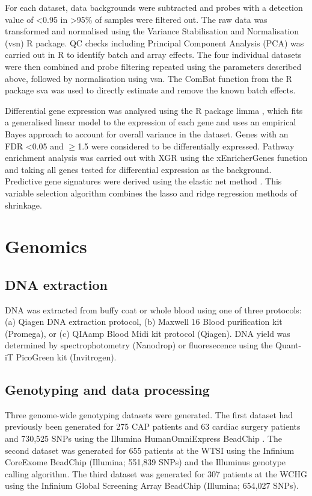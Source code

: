 For each dataset, data backgrounds were subtracted and probes with a detection value of \textless 0.95  in \textgreater 95\% of samples were filtered out. The raw data was transformed and normalised using the Variance Stabilisation and Normalisation (vsn) R package. QC checks including Principal Component Analysis (PCA) was carried out in R to identify batch and array effects. The four individual datasets were then combined and probe filtering repeated using the parameters described above, followed by normalisation using vsn. The ComBat function from the R package sva was used to directly estimate and remove the known batch effects. 

Differential gene expression was analysed using the R package limma \parencite{Ritchie2015}, which fits a generalised linear model to the expression of each gene and uses an empirical Bayes approach to account for overall variance in the dataset. Genes with an FDR \textless 0.05 and $\geq$1.5 were considered to be differentially expressed. Pathway enrichment analysis was carried out with XGR \parencite{Fang2016} using the xEnricherGenes function and taking all genes tested for differential expression as the background. Predictive gene signatures were derived using the elastic net method \parencite{Zou2005} \parencite{Herberg2016}. This variable selection algorithm combines the lasso and ridge regression methods of shrinkage. 

\section{Genomics}
\subsection{DNA extraction}
DNA was extracted from buffy coat or whole blood using one of three protocols: (a) Qiagen DNA extraction protocol, (b) Maxwell 16 Blood purification kit (Promega), or (c) QIAamp Blood Midi kit protocol (Qiagen). DNA yield was determined by spectrophotometry (Nanodrop) or fluoresecence using the Quant-iT PicoGreen kit (Invitrogen). 

\subsection{Genotyping and data processing}
Three genome-wide genotyping datasets were generated. The first dataset had previously been generated for 275 CAP patients and 63 cardiac surgery patients and 730,525 SNPs using the Illumina HumanOmniExpress BeadChip \parencite{Davenport2014}. The second dataset was generated for 655 patients at the WTSI using the Infinium CoreExome BeadChip (Illumina; 551,839 SNPs) and the Illuminus genotype calling algorithm. The third dataset was generated for 307 patients at the WCHG using the Infinium Global Screening Array BeadChip (Illumina; 654,027 SNPs).

